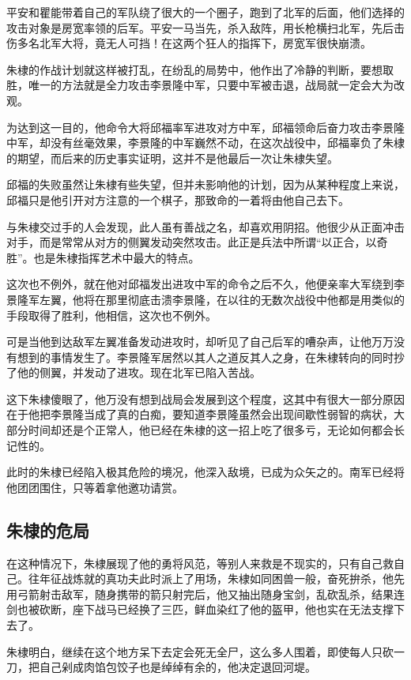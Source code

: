 \begin{multicols}{\theparacolNo}
		平安和瞿能带着自己的军队绕了很大的一个圈子，跑到了北军的后面，他们选择的攻击对象是房宽率领的后军。平安一马当先，杀入敌阵，用长枪横扫北军，先后击伤多名北军大将，竟无人可挡！在这两个狂人的指挥下，房宽军很快崩溃。

		朱棣的作战计划就这样被打乱，在纷乱的局势中，他作出了冷静的判断，要想取胜，唯一的方法就是全力攻击李景隆中军，只要中军被击退，战局就一定会大为改观。

		为达到这一目的，他命令大将邱福率军进攻对方中军，邱福领命后奋力攻击李景隆中军，却没有丝毫效果，李景隆的中军巍然不动，在这次战役中，邱福辜负了朱棣的期望，而后来的历史事实证明，这并不是他最后一次让朱棣失望。

		邱福的失败虽然让朱棣有些失望，但并未影响他的计划，因为从某种程度上来说，邱福只是他引开对方注意的一个棋子，那致命的一着将由他自己去下。

		与朱棣交过手的人会发现，此人虽有善战之名，却喜欢用阴招。他很少从正面冲击对手，而是常常从对方的侧翼发动突然攻击。此正是兵法中所谓“以正合，以奇胜”。也是朱棣指挥艺术中最大的特点。

		这次也不例外，就在他对邱福发出进攻中军的命令之后不久，他便亲率大军绕到李景隆军左翼，他将在那里彻底击溃李景隆，在以往的无数次战役中他都是用类似的手段取得了胜利，他相信，这次也不例外。

		可是当他到达敌军左翼准备发动进攻时，却听见了自己后军的嘈杂声，让他万万没有想到的事情发生了。李景隆军居然以其人之道反其人之身，在朱棣转向的同时抄了他的侧翼，并发动了进攻。现在北军已陷入苦战。

		这下朱棣傻眼了，他万没有想到战局会发展到这个程度，这其中有很大一部分原因在于他把李景隆当成了真的白痴，要知道李景隆虽然会出现间歇性弱智的病状，大部分时间却还是个正常人，他已经在朱棣的这一招上吃了很多亏，无论如何都会长记性的。

		此时的朱棣已经陷入极其危险的境况，他深入敌境，已成为众矢之的。南军已经将他团团围住，只等着拿他邀功请赏。

		\subsection{朱棣的危局}
		在这种情况下，朱棣展现了他的勇将风范，等别人来救是不现实的，只有自己救自己。往年征战炼就的真功夫此时派上了用场，朱棣如同困兽一般，奋死拚杀，他先用弓箭射击敌军，随身携带的箭只射完后，他又抽出随身宝剑，乱砍乱杀，结果连剑也被砍断，座下战马已经换了三匹，鲜血染红了他的盔甲，他也实在无法支撑下去了。

		朱棣明白，继续在这个地方呆下去定会死无全尸，这么多人围着，即使每人只砍一刀，把自己剁成肉馅包饺子也是绰绰有余的，他决定退回河堤。


\end{multicols}
